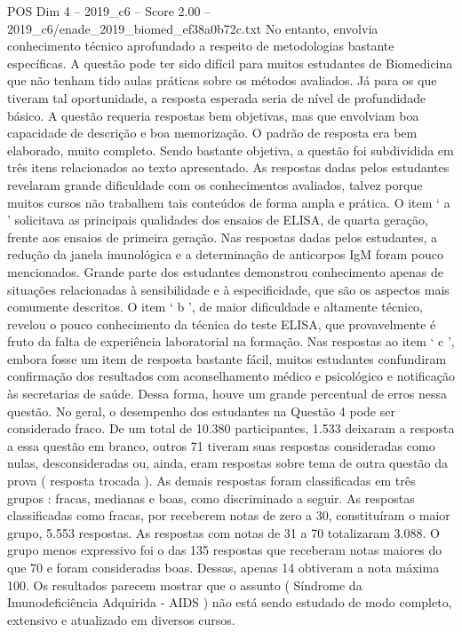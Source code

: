 \begin{textsample}{POS Dim 4 – 2019\_c6 – Score 2.00 – 2019\_c6/enade\_2019\_biomed\_ef38a0b72c.txt}
No entanto, envolvia conhecimento técnico aprofundado a respeito de metodologias bastante específicas.
A questão pode ter sido difícil para muitos estudantes de Biomedicina que não tenham tido aulas práticas sobre os métodos avaliados.
Já para os que tiveram tal oportunidade, a resposta esperada seria de nível de profundidade básico.
A questão requeria respostas bem objetivas, mas que envolviam boa capacidade de descrição e boa memorização.
O padrão de resposta era bem elaborado, muito completo.
Sendo bastante objetiva, a questão foi subdividida em três itens relacionados ao texto apresentado.
As respostas dadas pelos estudantes revelaram grande dificuldade com os conhecimentos avaliados, talvez porque muitos cursos não trabalhem tais conteúdos de forma ampla e prática.
O item ‘ a ’ solicitava as principais qualidades dos ensaios de ELISA, de quarta geração, frente aos ensaios de primeira geração.
Nas respostas dadas pelos estudantes, a redução da janela imunológica e a determinação de anticorpos IgM foram pouco mencionados.
Grande parte dos estudantes demonstrou conhecimento apenas de situações relacionadas à sensibilidade e à especificidade, que são os aspectos mais comumente descritos.
O item ‘ b ’, de maior dificuldade e altamente técnico, revelou o pouco conhecimento da técnica do teste ELISA, que provavelmente é fruto da falta de experiência laboratorial na formação.
Nas respostas ao item ‘ c ’, embora fosse um item de resposta bastante fácil, muitos estudantes confundiram confirmação dos resultados com aconselhamento médico e psicológico e notificação às secretarias de saúde.
Dessa forma, houve um grande percentual de erros nessa questão.
No geral, o desempenho dos estudantes na Questão 4 pode ser considerado fraco.
De um total de 10.380 participantes, 1.533 deixaram a resposta a essa questão em branco, outros 71 tiveram suas respostas consideradas como nulas, desconsideradas ou, ainda, eram respostas sobre tema de outra questão da prova ( resposta trocada ).
As demais respostas foram classificadas em três grupos : fracas, medianas e boas, como discriminado a seguir.
As respostas classificadas como fracas, por receberem notas de zero a 30, constituíram o maior grupo, 5.553 respostas.
As respostas com notas de 31 a 70 totalizaram 3.088.
O grupo menos expressivo foi o das 135 respostas que receberam notas maiores do que 70 e foram consideradas boas.
Dessas, apenas 14 obtiveram a nota máxima 100.
Os resultados parecem mostrar que o assunto ( Síndrome da Imunodeficiência Adquirida - AIDS ) não está sendo estudado de modo completo, extensivo e atualizado em diversos cursos.

\end{textsample}
